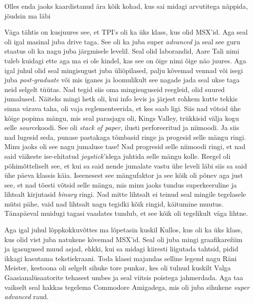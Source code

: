 Olles enda jaoks kaardistanud ära kõik kohad, kus sai midagi arvutitega näppida, jõudsin ma läbi

Väga tähtis on kusjuures see, et TPI's oli ka üks klass, kus olid MSX'id. Aga seal oli igal masinal juba drive taga. See oli ka juba super \emph{advanced} ja seal see guru staatus oli ka nagu juba järgmisele levelil. Seal olid  laborandid,
Aare Tali nimi tuleb kuidagi ette aga ma ei ole kindel, kas see on õige nimi õige näo juures. Aga igal juhul olid seal mingisugust juba üliõpilased,  palju kõvemad vennad või isegi juba \emph{post-graduate} või mis iganes ja loomulikult see nagade jada seal ukse taga neid selgelt tüütas. Nad tegid siis oma mingisuguseid reegleid, olid suured jumalused. Näiteks mingi hetk oli, kui info levis ja järjest rohkem kutte tekkis sinna värava taha,  oli vaja reglementeerida, et kes saab ligi. Siis nad võtsid ühe kõige popima mängu, mis seal parasjagu oli, Kings Valley, trükkisid välja kogu selle \emph{source}koodi. See oli \emph{stack of paper}, ilusti perforeeritud ja niimoodi. Ja siis nad lugesid seda, punase pastakaga tõmbasid ringe ja progesid selle mängu ringi. Minu jaoks oli see nagu jumaluse tase! Nad progresid selle niimoodi ringi, et nad said väikeste ise-ehitatud \emph{joystick}'idega juhtida selle mängu kolle. Reegel oli põhimõtteliselt see, et kui sa said nende jumalate vastu ühe leveli läbi siis sa said ühe päeva klassis käia. Iseenesest see mängufaktor ja see kõik oli põnev aga just see, et nad tõesti võtsid selle mängu, mis minu jaoks tundus superkeeruline ja lihtsalt kirjutasid \emph{binary} ringi. Nad mitte lihtsalt ei teinud seal mingile tegelasele mütsi pähe,  vaid nad lihtsalt nagu tegidki kõik ringid, käitumine muutus. Tänapäeval muidugi tagasi vaadates tundub, et see kõik oli tegelikult väga lihtne.


Aga igal juhul lõppkokkuvõttes ma lõpetasin kuskil Kullos, kus oli ka üks klass, kus olid vist juba natukene kõvemad MSX'id. Seal oli juba  mingi graafikarežiim ja igasugused muud asjad, ehkki, kui sa midagi kiiresti liigutada tahtsid, pidid ikkagi kasutama tekstiekraani. Toda klassi majandas selline legend nagu Räni Meister, kestoona oli selgelt sihuke tore punkar, kes oli tulnud kuskilt Valga Gaasianalüsaatorite tehasest umbes ja seal viitsis poistega jahmerdada. Aga taa vaikselt seal hakkas tegelema Commodore Amigadega, mis oli juba sihukene \emph{super advanced} raud. 

